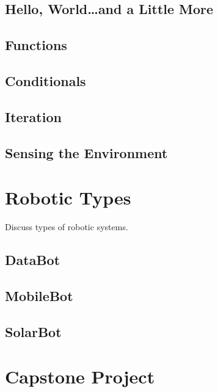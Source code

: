 \documentclass[
]{book}
\begin{document}
\hypertarget{hello-worldand-a-little-more}{%
\section{Hello, World\ldots and a Little More}\label{hello-worldand-a-little-more}}

\hypertarget{functions}{%
\section{Functions}\label{functions}}

\hypertarget{conditionals}{%
\section{Conditionals}\label{conditionals}}

\hypertarget{iteration}{%
\section{Iteration}\label{iteration}}

\hypertarget{sensing-the-environment}{%
\section{Sensing the Environment}\label{sensing-the-environment}}

\hypertarget{robotic-types}{%
\chapter{Robotic Types}\label{robotic-types}}

Discuss types of robotic systems.

\hypertarget{databot}{%
\section{DataBot}\label{databot}}

\hypertarget{mobilebot}{%
\section{MobileBot}\label{mobilebot}}

\hypertarget{solarbot}{%
\section{SolarBot}\label{solarbot}}

\hypertarget{capstone-project}{%
\chapter{Capstone Project}\label{capstone-project}}
\end{document}
